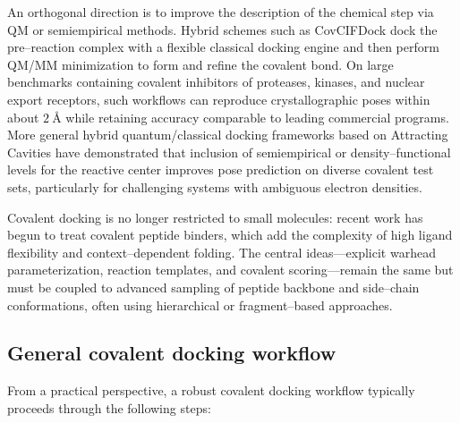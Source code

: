 \documentclass[12pt]{article}
\begin{document}
An orthogonal direction is to improve the description of the chemical step via QM or semiempirical methods.  
Hybrid schemes such as CovCIFDock dock the pre–reaction complex with a flexible classical docking engine and then perform QM/MM minimization to form and refine the covalent bond.
On large benchmarks containing covalent inhibitors of proteases, kinases, and nuclear export receptors, such workflows can reproduce crystallographic poses within about \(2~\text{\AA}\) while retaining accuracy comparable to leading commercial programs.\cite{CH14_CovCIFDock2025} 
More general hybrid quantum/classical docking frameworks based on Attracting Cavities have demonstrated that inclusion of semiempirical or density–functional levels for the reactive center improves pose prediction on diverse covalent test sets, particularly for challenging systems with ambiguous electron densities.\cite{CH14_HybridQMClassDocking2025}

Covalent docking is no longer restricted to small molecules: recent work has begun to treat covalent peptide binders, which add the complexity of high ligand flexibility and context–dependent folding. 
The central ideas—explicit warhead parameterization, reaction templates, and covalent scoring—remain the same but must be coupled to advanced sampling of peptide backbone and side–chain conformations, often using hierarchical or fragment–based approaches.\cite{CH14_Covpepdock}

\subsection{General covalent docking workflow}

From a practical perspective, a robust covalent docking workflow typically proceeds through the following steps:
\end{document}
